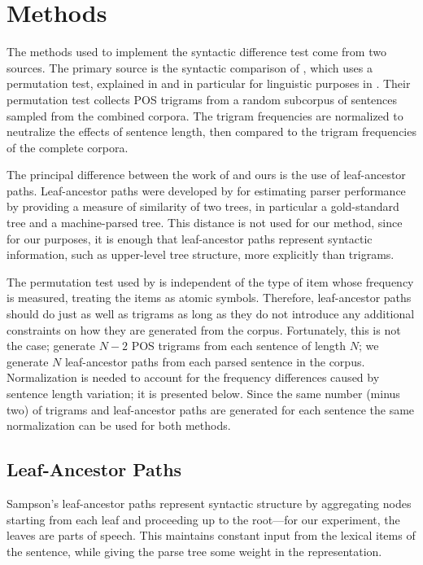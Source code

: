 \documentclass[11pt,letterpaper]{article}
\begin{document}
\section{Methods}

The methods used to implement the syntactic difference test come from two
sources. The primary source is the syntactic comparison of
, which uses a permutation test, explained in
 and in particular for linguistic purposes in
. Their permutation test
collects POS trigrams from a random subcorpus of sentences
sampled from the combined corpora. The trigram frequencies are
normalized to neutralize the
effects of sentence length, then compared to the
trigram frequencies of the complete corpora.

The principal difference between the work of  and ours is
the use of leaf-ancestor paths.
Leaf-ancestor paths were developed by  for
estimating parser performance by providing a measure of similarity of
two trees, in particular a gold-standard tree and a machine-parsed
tree. This distance is not used for our method, since for our purposes,
it is enough that leaf-ancestor paths represent syntactic information, such as
upper-level tree structure, more explicitly than trigrams.

The permutation test used by  is independent of the
type of item whose frequency is measured, treating the items as atomic
symbols. Therefore, leaf-ancestor paths should do just as well as
trigrams as long as they do not introduce any additional constraints
on how they are generated from the corpus. Fortunately, this is not
the case;  generate $N-2$ POS trigrams from each
sentence of length $N$; we generate $N$ leaf-ancestor paths from each
parsed sentence in the corpus. Normalization is needed to account for
the frequency differences caused by sentence length variation; it is
presented below. Since the same number (minus two) of trigrams and
leaf-ancestor paths are generated for each sentence the same
normalization can be used for both methods.

\subsection{Leaf-Ancestor Paths}

Sampson's leaf-ancestor paths represent syntactic structure
by aggregating nodes starting from each leaf and proceeding up to
the root---for our experiment, the leaves are parts of speech.
This maintains constant input from
the lexical items of the sentence, while giving the parse tree some
weight in the representation.
\end{document}
